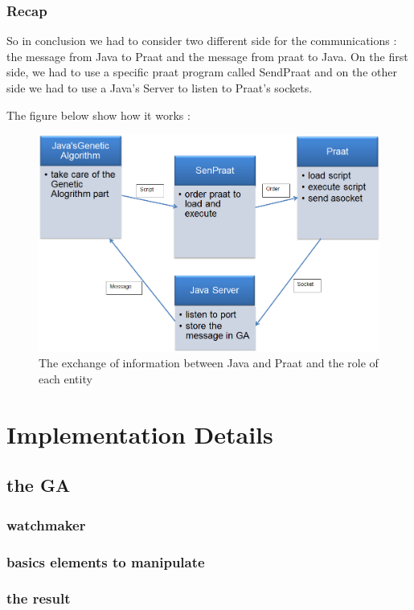 \documentclass[12pt]{report}
\begin{document}
\section{Recap}
So in conclusion we had to consider two different side for the communications : the message from Java to Praat and the message from praat to Java. On the first side, we had to use a specific praat program called SendPraat and on the other side we had to use a Java's Server to listen to Praat's sockets.

The figure below show how it works :
\begin{figure}
\begin{center}
\includegraphics[scale=0.6]{resources/architecture.png} 
\end{center}
\caption{The exchange of information between Java and Praat and the role of each entity}
\label{architecture}
\end{figure}


\part{Implementation Details}
\chapter{the GA}
\section{watchmaker}
\section{basics elements to manipulate}
\section{the result}
\end{document}
